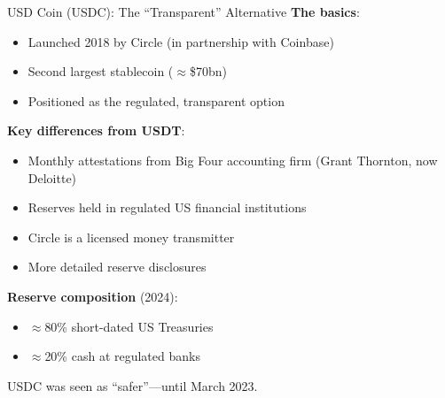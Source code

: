 \documentclass[10pt]{beamer}
\begin{document}
\begin{frame}{USD Coin (USDC): The ``Transparent'' Alternative}
  \textbf{The basics}:
  \begin{itemize}
    \item Launched 2018 by Circle (in partnership with Coinbase)
    \item Second largest stablecoin ($\approx$\$70bn)
    \item Positioned as the regulated, transparent option
  \end{itemize}
  
  \vspace{0.5em}
  \textbf{Key differences from USDT}:
  \begin{itemize}
    \item Monthly attestations from Big Four accounting firm (Grant Thornton, now Deloitte)
    \item Reserves held in regulated US financial institutions
    \item Circle is a licensed money transmitter
    \item More detailed reserve disclosures
  \end{itemize}
  
  \vspace{1em}
  \textbf{Reserve composition} (2024):
  \begin{itemize}
    \item $\approx$80\% short-dated US Treasuries
    \item $\approx$20\% cash at regulated banks
  \end{itemize}
  
  \vspace{0.5em}
  USDC was seen as ``safer''---until March 2023.
\end{frame}
\end{document}
